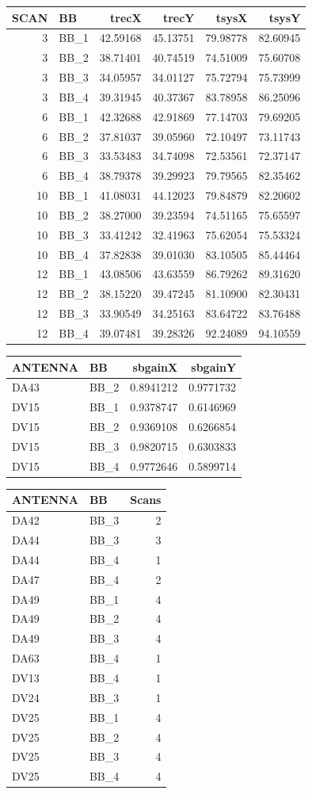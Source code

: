 \documentclass[10pt,]{article}
\begin{document}
\begin{longtable}[c]{@{}rlrrrr@{}}
\toprule
SCAN & BB & trecX & trecY & tsysX & tsysY\tabularnewline
\midrule
\endhead
3 & BB\_1 & 42.59168 & 45.13751 & 79.98778 & 82.60945\tabularnewline
3 & BB\_2 & 38.71401 & 40.74519 & 74.51009 & 75.60708\tabularnewline
3 & BB\_3 & 34.05957 & 34.01127 & 75.72794 & 75.73999\tabularnewline
3 & BB\_4 & 39.31945 & 40.37367 & 83.78958 & 86.25096\tabularnewline
6 & BB\_1 & 42.32688 & 42.91869 & 77.14703 & 79.69205\tabularnewline
6 & BB\_2 & 37.81037 & 39.05960 & 72.10497 & 73.11743\tabularnewline
6 & BB\_3 & 33.53483 & 34.74098 & 72.53561 & 72.37147\tabularnewline
6 & BB\_4 & 38.79378 & 39.29923 & 79.79565 & 82.35462\tabularnewline
10 & BB\_1 & 41.08031 & 44.12023 & 79.84879 & 82.20602\tabularnewline
10 & BB\_2 & 38.27000 & 39.23594 & 74.51165 & 75.65597\tabularnewline
10 & BB\_3 & 33.41242 & 32.41963 & 75.62054 & 75.53324\tabularnewline
10 & BB\_4 & 37.82838 & 39.01030 & 83.10505 & 85.44464\tabularnewline
12 & BB\_1 & 43.08506 & 43.63559 & 86.79262 & 89.31620\tabularnewline
12 & BB\_2 & 38.15220 & 39.47245 & 81.10900 & 82.30431\tabularnewline
12 & BB\_3 & 33.90549 & 34.25163 & 83.64722 & 83.76488\tabularnewline
12 & BB\_4 & 39.07481 & 39.28326 & 92.24089 & 94.10559\tabularnewline
\bottomrule
\end{longtable}

\begin{longtable}[c]{@{}llrr@{}}
\toprule
ANTENNA & BB & sbgainX & sbgainY\tabularnewline
\midrule
\endhead
DA43 & BB\_2 & 0.8941212 & 0.9771732\tabularnewline
DV15 & BB\_1 & 0.9378747 & 0.6146969\tabularnewline
DV15 & BB\_2 & 0.9369108 & 0.6266854\tabularnewline
DV15 & BB\_3 & 0.9820715 & 0.6303833\tabularnewline
DV15 & BB\_4 & 0.9772646 & 0.5899714\tabularnewline
\bottomrule
\end{longtable}

\begin{longtable}[c]{@{}llr@{}}
\toprule
ANTENNA & BB & Scans\tabularnewline
\midrule
\endhead
DA42 & BB\_3 & 2\tabularnewline
DA44 & BB\_3 & 3\tabularnewline
DA44 & BB\_4 & 1\tabularnewline
DA47 & BB\_4 & 2\tabularnewline
DA49 & BB\_1 & 4\tabularnewline
DA49 & BB\_2 & 4\tabularnewline
DA49 & BB\_3 & 4\tabularnewline
DA63 & BB\_4 & 1\tabularnewline
DV13 & BB\_4 & 1\tabularnewline
DV24 & BB\_3 & 1\tabularnewline
DV25 & BB\_1 & 4\tabularnewline
DV25 & BB\_2 & 4\tabularnewline
DV25 & BB\_3 & 4\tabularnewline
DV25 & BB\_4 & 4\tabularnewline
\bottomrule
\end{longtable}
\end{document}
